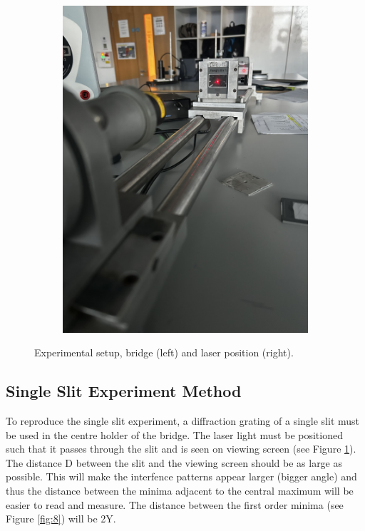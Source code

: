 \documentclass[12pt]{article}
\begin{document}
\begin{figure}[H]
\begin{subfigure}[H]{.418\textwidth}
        \includegraphics[width=\linewidth,angle=270]{candid laser shot.jpeg}
    \end{subfigure}
    \caption{Experimental setup, bridge (left) and laser position (right).}
    \label{fig:7}
\end{figure}

\subsection{Single Slit Experiment Method} \label{sec:2.1}

To reproduce the single slit experiment, a diffraction grating of a single slit must be used in the centre holder of the bridge. The laser light must be positioned
such that it passes through the slit and is seen on viewing screen (see Figure \ref{fig:7}). The distance D between the slit and the viewing screen should be as large as possible. This will make the interfence patterns appear larger (bigger angle) and thus the
distance between the minima adjacent to the central maximum will be easier to read and measure. The distance between the first order minima (see Figure \ref{fig:8}) will be 2Y.
\end{document}
